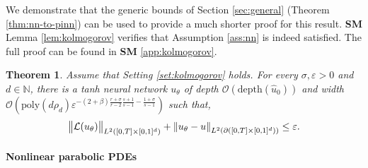 \documentclass{article}
\numberwithin{equation}{section}
\newcommand{\poly}{\mathrm{poly}}
\newcommand{\N}{\mathbb{N}}
\newcommand{\cL}{\mathcal{L}}
\newcommand{\uhat}{{\widehat{u}}}
\renewcommand{\epsilon}{\varepsilon}
\newcommand{\1}{\mathbbm{1}}
\newcommand{\bigO}{\mathcal{O}}
\newtheorem{theorem}{Theorem}[section]
\begin{document}
We demonstrate that the generic bounds of Section \ref{sec:general} (Theorem \ref{thm:nn-to-pinn}) can be used to provide a much shorter proof for this result. {\bf SM} Lemma \ref{lem:kolmogorov} verifies that Assumption \ref{ass:nn} is indeed satisfied. The full proof can be found in \textbf{SM} \ref{app:kolmogorov}. 

\begin{theorem}\label{thm:kolmogorov}
Assume that Setting \ref{set:kolmogorov} holds. For every $\sigma,\epsilon>0$ and $d\in\N$, there is a tanh neural network $u_\theta$ of depth $\bigO(\mathrm{depth}(\uhat_0))$ and width $\bigO(\poly(d\rho_d)\epsilon^{-(2+\beta)\frac{r+\sigma}{r-2}\frac{s+1}{s-1}-\frac{1+\sigma}{s-1}})$ such that,
\begin{equation}
    \norm{\cL(u_\theta)}_{L^2([0,T]\times [0,1]^d)} + \norm{u_\theta-u}_{L^2(\partial([0,T]\times [0,1]^d))} \leq \epsilon.
\end{equation}
\end{theorem}

\paragraph{Nonlinear parabolic PDEs}
\end{document}
